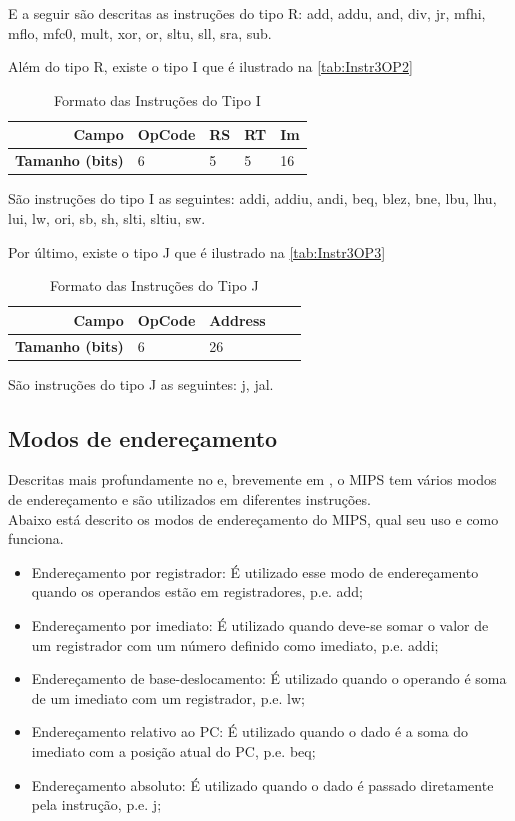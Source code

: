 \documentclass[
	12pt,
	openright,
	a4paper,
	english,			
	french,				
	spanish,			
	brazil,				
	]{abntex2}
\begin{document}
E a seguir são descritas as instruções do tipo R: add,
addu, 	
and,	
div, 	
jr,
mfhi, 	
mflo, 	
mfc0, 	
mult, 	
xor, 	 	
or, 	
sltu, 	
sll, 	
sra, 	
sub.

Além do tipo R, existe o tipo I que é ilustrado na \autoref{tab:Instr3OP2}


\begin{table}[htb]
\centering
\ABNTEXfontereduzida
\caption{Formato das Instruções do Tipo I} \label{tab:Instr3OP2}
\begin{tabular}{r|p{2cm}|p{1.7cm}|p{1.7cm}|p{3cm}} 
\textbf{Campo} & OpCode & RS & RT & Im \\ \hline
\textbf{Tamanho (bits)} & 6 & 5 & 5 & 16\\ \hline
\end{tabular}
\end{table}

São instruções do tipo I as seguintes: 
addi,
addiu, 
andi,
beq,
blez,
bne,
lbu,
lhu,
lui,
lw,	
ori,
sb,
sh,		
slti, 	
sltiu,
sw.

Por último, existe o tipo J que é ilustrado na \autoref{tab:Instr3OP3}
\begin{table}[htb]
\centering
\ABNTEXfontereduzida
\caption{Formato das Instruções do Tipo J} \label{tab:Instr3OP3}
\begin{tabular}{r|p{2cm}|p{1.7cm}|p{1.7cm}|p{3cm}} 
\textbf{Campo} & OpCode & Address \\ \hline
\textbf{Tamanho (bits)} & 6 & 26\\ \hline
\end{tabular}
\end{table}

São instruções do tipo J as seguintes: j, jal.

\subsection{Modos de endereçamento}
Descritas mais profundamente no \cite{patterson2007} e, brevemente em \cite{addrmodes}, o MIPS tem vários modos de endereçamento e são utilizados em diferentes instruções.\\
Abaixo está descrito os modos de endereçamento do MIPS, qual seu uso e como funciona.
\begin{itemize}
	\item Endereçamento por registrador: É utilizado esse modo de endereçamento quando os operandos estão em registradores, p.e. add;
	\item Endereçamento por imediato: É utilizado quando deve-se somar o valor de um registrador com um número definido como imediato, p.e. addi;
	\item Endereçamento de base-deslocamento: É utilizado quando o operando é soma de um imediato com um registrador, p.e. lw;
	\item Endereçamento relativo ao PC: É utilizado quando o dado é a soma do imediato com a posição atual do PC, p.e. beq;
	\item Endereçamento absoluto: É utilizado quando o dado é passado diretamente pela instrução, p.e. j;
\end{itemize}
\end{document}
